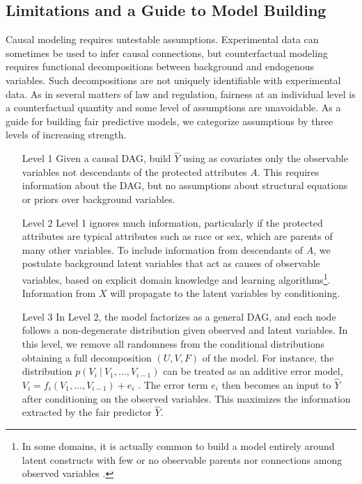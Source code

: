 \subsection{Limitations and a Guide to Model Building}
\label{sec:limit-guide-model}
Causal modeling requires untestable assumptions. Experimental data can
sometimes be used to infer causal connections, but counterfactual
modeling requires functional
decompositions between background and endogenous variables.
Such decompositions are not
uniquely identifiable  with experimental data. As in several
matters of law and regulation, fairness at an individual level is a
counterfactual quantity and some level of assumptions
are unavoidable. As a guide for building fair predictive models, we
categorize assumptions by three levels of increasing strength.
%
\begin{itemize}
\item[Level 1] Given a causal DAG, build $\hat Y$
  using as covariates only the observable variables  not
  descendants of the protected attributes $A$. This
  requires information about the DAG, but no
  assumptions about structural equations or priors over background
  variables. %
\item[Level 2] Level 1 ignores much information, particularly if the protected
  attributes are typical attributes such as race or sex,
  which are parents of many other variables. To include information
  from descendants of $A$, we postulate background latent variables
  that act as causes of observable variables, based on explicit domain
  knowledge and learning algorithms\footnote{In some domains, it is
    actually common to build a model entirely around latent constructs
    with few or no observable parents nor connections among observed
    variables \citep{bol:89}.}. Information from $X$ will propagate to
  the latent variables by conditioning.%
 \item[Level 3] In Level 2, the model factorizes as a
   general DAG, and each node follows a non-degenerate
   distribution given observed and latent variables. %
   In this level, we remove all randomness from the conditional
   distributions obtaining a full decomposition $(U, V, F)$ of the
   model. %
   For instance, the distribution
   $p(V_i\ |\ V_1, \dots, V_{i - 1})$ can be treated as an additive
   error model, $V_i \!=\! f_i(V_1, \dots, V_{i - 1}) \!+\! e_i$
   \citep{peters:14}. The error term $e_i$ then becomes an input
   to $\hat Y$ after conditioning on the observed variables. This
   maximizes the information extracted
   by the fair predictor $\hat Y$.
\end{itemize}


